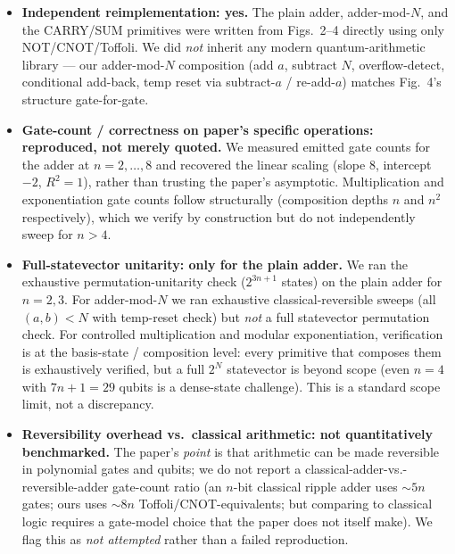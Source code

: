 \documentclass[11pt]{article}
\begin{document}
\begin{itemize}
  \item \textbf{Independent reimplementation: yes.}
        The plain adder, adder-mod-$N$, and the CARRY/SUM primitives were
        written from Figs.~2--4 directly using only NOT/CNOT/Toffoli. We did
        \emph{not} inherit any modern quantum-arithmetic library --- our
        adder-mod-$N$ composition (add $a$, subtract $N$, overflow-detect,
        conditional add-back, temp reset via subtract-$a$ / re-add-$a$) matches
        Fig.~4's structure gate-for-gate.

  \item \textbf{Gate-count / correctness on paper's specific operations:
        reproduced, not merely quoted.}
        We measured emitted gate counts for the adder at $n{=}2,\dots,8$ and
        recovered the linear scaling (slope $8$, intercept $-2$, $R^{2} = 1$),
        rather than trusting the paper's asymptotic. Multiplication and
        exponentiation gate counts follow structurally (composition depths $n$
        and $n^{2}$ respectively), which we verify by construction but do not
        independently sweep for $n{>}4$.

  \item \textbf{Full-statevector unitarity: only for the plain adder.}
        We ran the exhaustive permutation-unitarity check ($2^{3n+1}$ states)
        on the plain adder for $n{=}2,3$. For adder-mod-$N$ we ran exhaustive
        classical-reversible sweeps (all $(a,b)<N$ with temp-reset check) but
        \emph{not} a full statevector permutation check. For controlled
        multiplication and modular exponentiation, verification is at the
        basis-state / composition level: every primitive that composes them is
        exhaustively verified, but a full $2^{N}$ statevector is beyond scope
        (even $n{=}4$ with $7n{+}1{=}29$ qubits is a dense-state challenge).
        This is a standard scope limit, not a discrepancy.

  \item \textbf{Reversibility overhead vs.\ classical arithmetic: not
        quantitatively benchmarked.}
        The paper's \emph{point} is that arithmetic can be made reversible in
        polynomial gates and qubits; we do not report a
        classical-adder-vs.-reversible-adder gate-count ratio (an $n$-bit
        classical ripple adder uses $\sim\!5n$ gates; ours uses $\sim\!8n$
        Toffoli/CNOT-equivalents; but comparing to classical logic requires a
        gate-model choice that the paper does not itself make). We flag this
        as \emph{not attempted} rather than a failed reproduction.


\end{itemize}
\end{document}
